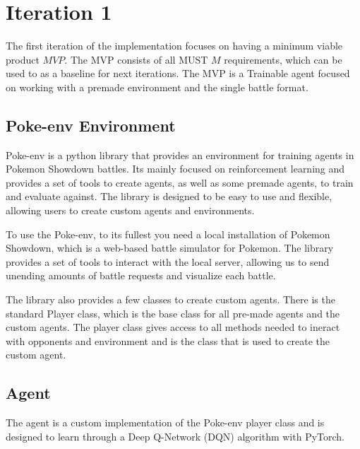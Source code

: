 \section{Iteration 1}
\label{sec:Iteration-1-Agent-Environment}

The first iteration of the implementation focuses on having a minimum viable product \(MVP\). The MVP
consists of all MUST \(M\) requirements, which can be used to as a baseline for next iterations.
The MVP is a Trainable agent focused on working with a premade environment and the single battle format.

\subsection{Poke-env Environment}
Poke-env is a python library that provides an environment for training agents in Pokemon Showdown battles.
Its mainly focused on reinforcement learning and provides a set of tools to create agents, 
as well as some premade agents, to train and evaluate against. The library is designed to be easy to 
use and flexible, allowing users to create custom agents and environments.

To use the Poke-env, to its fullest you need a local installation of Pokemon Showdown, 
which is a web-based battle simulator for Pokemon. The library provides a set of tools to 
interact with the local server, allowing us to send unending amounts of battle requests and visualize
each battle.

The library also provides a few classes to create custom agents. There is the standard Player class,
which is the base class for all pre-made agents and the custom agents. 
The player class gives access to all methods needed to ineract with opponents and environment and is
the class that is used to create the custom agent. 

\subsection{Agent}
The agent is a custom implementation of the Poke-env player class and is designed to learn through 
a Deep Q-Network (DQN) algorithm with PyTorch. 


